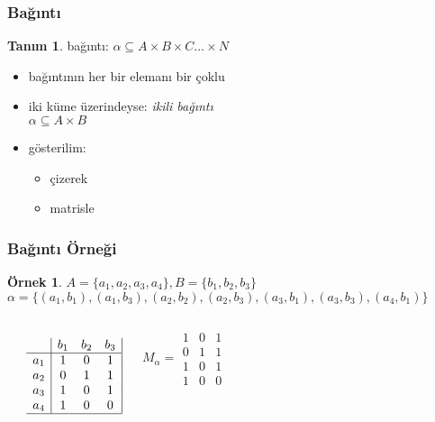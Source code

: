 \documentclass[dvipsnames]{beamer}
\theoremstyle{definition}
\newtheorem{tanim}[theorem]{Tanım}
\theoremstyle{example}
\newtheorem{ornek}[theorem]{Örnek}
\theoremstyle{plain}
\begin{document}
\begin{frame}
  \frametitle{Bağıntı}

  \begin{tanim}
    \alert{bağıntı}: $\alpha \subseteq A \times B \times C \dots \times N$
  \end{tanim}

  \pause
  \begin{itemize}
    \item bağıntının her bir elemanı bir \alert{çoklu}

    \pause
    \medskip
    \item iki küme üzerindeyse: \emph{ikili bağıntı}\\
      $\alpha \subseteq A \times B$

    \pause
    \medskip
    \item gösterilim:
    \begin{itemize}
      \item çizerek
      \item matrisle
    \end{itemize}
  \end{itemize}
\end{frame}

\begin{frame}
  \frametitle{Bağıntı Örneği}

  \begin{ornek}
    $A=\{a_1,a_2,a_3,a_4\}, B=\{b_1,b_2,b_3\}$\\
    $\alpha = \{(a_1,b_1),(a_1,b_3),(a_2,b_2),(a_2,b_3),
                (a_3,b_1),(a_3,b_3),(a_4,b_1)\}$

    \pause
    \medskip
    \begin{columns}
      \begin{center}
      \end{center}

      \[ \begin{array}{c|ccc|}
              & b_1 & b_2 & b_3\\\hline
          a_1 &  1  &  0  &  1\\
          a_2 &  0  &  1  &  1\\
          a_3 &  1  &  0  &  1\\
          a_4 &  1  &  0  &  0\\\hline
        \end{array} \]

      \[ M_\alpha =
        \begin{array}{|ccc|}
          1 & 0 & 1\\
          0 & 1 & 1\\
          1 & 0 & 1\\
          1 & 0 & 0
        \end{array}
      \]
    \end{columns}
  \end{ornek}
\end{frame}
\end{document}
